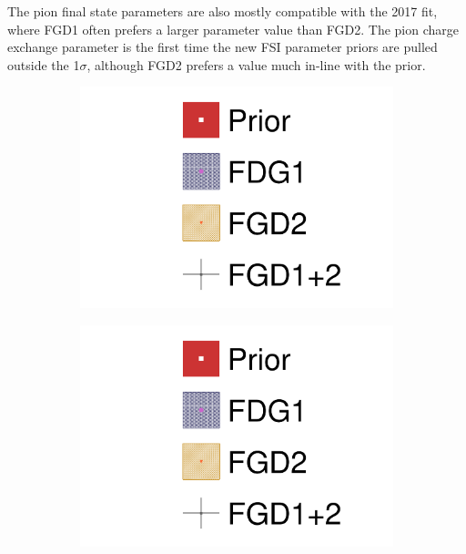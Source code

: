 The pion final state parameters are also mostly compatible with the 2017 fit, where FGD1 often prefers a larger parameter value than FGD2. The pion charge exchange parameter is the first time the new FSI parameter priors are pulled outside the 1$\sigma$, although FGD2 prefers a value much in-line with the prior.
\begin{figure}[h]
	\centering
	\begin{subfigure}[t]{0.49\textwidth}
		\includegraphics[width=\textwidth,page=18, trim={0mm 0mm 0mm 9mm}, clip]{figures/mach3/2018/data/2018a_FixedCov_RedCov_Mpi_FGD1Only_Data_merge_2018a_FixedCov_RedCov_Mpi_FGD2Only_Data_merge_2018a_FixedCov_RedCov_Mpi_Data_merge}
	\end{subfigure}
	\begin{subfigure}[t]{0.49\textwidth}
		\includegraphics[width=\textwidth,page=19, trim={0mm 0mm 0mm 9mm}, clip]{figures/mach3/2018/data/2018a_FixedCov_RedCov_Mpi_FGD1Only_Data_merge_2018a_FixedCov_RedCov_Mpi_FGD2Only_Data_merge_2018a_FixedCov_RedCov_Mpi_Data_merge}
	\end{subfigure}
	

\end{figure}
